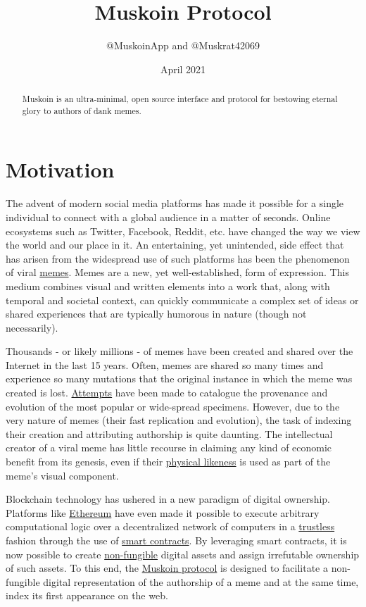 \documentclass{article}
\title{Muskoin Protocol}
\author{@MuskoinApp and @Muskrat42069}
\date{April 2021}
\begin{document}
\maketitle

\begin{abstract}

Muskoin is an ultra-minimal, open source interface and protocol for bestowing eternal glory to authors of dank memes.

\end{abstract}

\section{Motivation}
The advent of modern social media platforms has made it possible for a single individual to connect with a global audience in a matter of seconds. Online ecosystems 
such as Twitter, Facebook, Reddit, etc. have changed the way we view the world and our place in it. An entertaining, yet unintended, side effect that has arisen from 
the widespread use of such platforms has been the phenomenon of viral \href{https://en.wikipedia.org/wiki/Meme}{memes}. Memes are a new, yet well-established, form of expression. This medium combines visual and written elements into a work that, along with temporal and societal context, can quickly communicate a complex set of ideas or shared experiences that 
are typically humorous in nature (though not necessarily). 

Thousands - or likely millions - of memes have been created and shared over the Internet in the last 15 years. Often, memes are shared so many times and experience so many mutations
that the original instance in which the meme was created is lost. \href{https://knowyourmeme.com/ }{Attempts} have been made to catalogue the provenance and evolution of the most popular or wide-spread specimens. However, due to the very nature of memes (their fast replication and evolution), the task of indexing their creation and attributing authorship is quite daunting. The intellectual creator of a viral meme has little recourse in claiming any kind of economic benefit from its genesis, even if their \href{https://en.wikipedia.org/wiki/Bad_Luck_Brian}{physical likeness} is used as
part of the meme's visual component. 

Blockchain technology has ushered in a new paradigm of digital ownership. Platforms like \href{https://ethereum.org/en/}{Ethereum} have even made it possible 
to execute arbitrary computational logic over a decentralized network of computers in a 
\href{https://www.nananke.com/single-post/2018/08/07/zero-trust-vs-trustless-systems}{trustless} fashion through the use of 
\href{https://en.wikipedia.org/wiki/Smart_contract}{smart contracts}. By leveraging smart contracts, it is now possible to create 
\href{https://www.investopedia.com/terms/f/fungibility.asp}{non-fungible} digital assets and assign irrefutable ownership of such assets. To this end, the 
\href{https://muskoin.app}{Muskoin protocol} is designed to facilitate a non-fungible digital representation of the authorship of a meme and at the same 
time, index its first appearance on the web.
\end{document}
